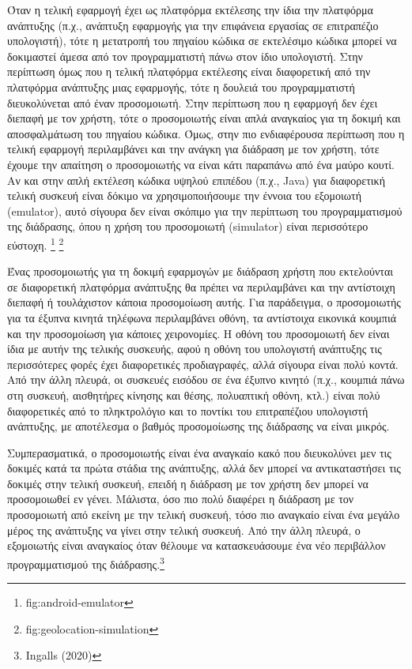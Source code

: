 \documentclass[
]{article}
\begin{document}
Όταν η τελική εφαρμογή έχει ως πλατφόρμα εκτέλεσης την ίδια την
πλατφόρμα ανάπτυξης (π.χ., ανάπτυξη εφαρμογής για την επιφάνεια εργασίας
σε επιτραπέζιο υπολογιστή), τότε η μετατροπή του πηγαίου κώδικα σε
εκτελέσιμο κώδικα μπορεί να δοκιμαστεί άμεσα από τον προγραμματιστή πάνω
στον ίδιο υπολογιστή. Στην περίπτωση όμως που η τελική πλατφόρμα
εκτέλεσης είναι διαφορετική από την πλατφόρμα ανάπτυξης μιας εφαρμογής,
τότε η δουλειά του προγραμματιστή διευκολύνεται από έναν προσομοιωτή.
Στην περίπτωση που η εφαρμογή δεν έχει διεπαφή με τον χρήστη, τότε ο
προσομοιωτής είναι απλά αναγκαίος για τη δοκιμή και αποσφαλμάτωση του
πηγαίου κώδικα. Όμως, στην πιο ενδιαφέρουσα περίπτωση που η τελική
εφαρμογή περιλαμβάνει και την ανάγκη για διάδραση με τον χρήστη, τότε
έχουμε την απαίτηση ο προσομοιωτής να είναι κάτι παραπάνω από ένα μαύρο
κουτί. Αν και στην απλή εκτέλεση κώδικα υψηλού επιπέδου (π.χ., Java) για
διαφορετική τελική συσκευή είναι δόκιμο να χρησιμοποιήσουμε την έννοια
του εξομοιωτή (emulator), αυτό σίγουρα δεν είναι σκόπιμο για την
περίπτωση του προγραμματισμού της διάδρασης, όπου η χρήση του
προσομοιωτή (simulator) είναι περισσότερο εύστοχη. \footnote{fig:android-emulator}
\footnote{fig:geolocation-simulation}

Ένας προσομοιωτής για τη δοκιμή εφαρμογών με διάδραση χρήστη που
εκτελούνται σε διαφορετική πλατφόρμα ανάπτυξης θα πρέπει να περιλαμβάνει
και την αντίστοιχη διεπαφή ή τουλάχιστον κάποια προσομοίωση αυτής. Για
παράδειγμα, ο προσομοιωτής για τα έξυπνα κινητά τηλέφωνα περιλαμβάνει
οθόνη, τα αντίστοιχα εικονικά κουμπιά και την προσομοίωση για κάποιες
χειρονομίες. Η οθόνη του προσομοιωτή δεν είναι ίδια με αυτήν της τελικής
συσκευής, αφού η οθόνη του υπολογιστή ανάπτυξης τις περισσότερες φορές
έχει διαφορετικές προδιαγραφές, αλλά σίγουρα είναι πολύ κοντά. Από την
άλλη πλευρά, οι συσκευές εισόδου σε ένα έξυπνο κινητό (π.χ., κουμπιά
πάνω στη συσκευή, αισθητήρες κίνησης και θέσης, πολυαπτική οθόνη, κτλ.)
είναι πολύ διαφορετικές από το πληκτρολόγιο και το ποντίκι του
επιτραπέζιου υπολογιστή ανάπτυξης, με αποτέλεσμα ο βαθμός προσομοίωσης
της διάδρασης να είναι μικρός.

Συμπερασματικά, ο προσομοιωτής είναι ένα αναγκαίο κακό που διευκολύνει
μεν τις δοκιμές κατά τα πρώτα στάδια της ανάπτυξης, αλλά δεν μπορεί να
αντικαταστήσει τις δοκιμές στην τελική συσκευή, επειδή η διάδραση με τον
χρήστη δεν μπορεί να προσομοιωθεί εν γένει. Μάλιστα, όσο πιο πολύ
διαφέρει η διάδραση με τον προσομοιωτή από εκείνη με την τελική συσκευή,
τόσο πιο αναγκαίο είναι ένα μεγάλο μέρος της ανάπτυξης να γίνει στην
τελική συσκευή. Από την άλλη πλευρά, ο εξομοιωτής είναι αναγκαίος όταν
θέλουμε να κατασκευάσουμε ένα νέο περιβάλλον προγραμματισμού της
διάδρασης.\footnote{Ingalls (2020)}
\end{document}
